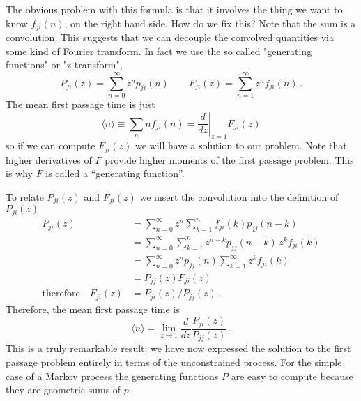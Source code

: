 \documentclass{article}
\begin{document}
The obvious problem with this formula is that it involves the thing we want to know $f_{ji}(n)$, on the right hand side.
How do we fix this? Note that the sum is a convolution.
This suggests that we can decouple the convolved quantities via some kind of Fourier transform.
In fact we use the so called "generating functions" or "z-transform",
\begin{equation}
P_{ji}(z)=\sum_{n=0}^{\infty}z^{n}p_{ji}(n)\qquad F_{ji}(z)=\sum_{n=1}^{\infty}z^{n}f_{ji}(n) \, .
\end{equation}
The mean first passage time is just
\begin{equation}
\langle n \rangle \equiv \sum_n n f_{ji}(n) = \left. \frac{d}{dz}\right|_{z=1}F_{ji}(z)
\end{equation}
so if we can compute $F_{ji}(z)$ we will have a solution to our problem.
Note that higher derivatives of $F$ provide higher moments of the first passage problem.
This is why $F$ is called a ``generating function''.

To relate $P_{ji}(z)$ and $F_{ji}(z)$ we insert the convolution into the definition of $P_{ji}(z)$
\begin{align*}
P_{ji}(z)
& = \sum_{n=0}^{\infty}z^{n}\sum_{k=1}^{n}f_{ji}(k)p_{jj}(n-k)\\
& = \sum_{n=0}^{\infty}\sum_{k=1}^{n}z^{n-k}p_{jj}(n-k)\, z^{k}f_{ji}(k)\\
& = \sum_{n=0}^{\infty}z^{n}p_{jj}(n)\sum_{k=1}^{\infty}z^{k}f_{ji}(k)\\
& = P_{jj}(z)F_{ji}(z)\\
\textrm{therefore}\quad F_{ji}(z) & = P_{ji}(z)/P_{jj}(z) \, .
\end{align*}
Therefore, the mean first passage time is
\begin{equation}
\langle n \rangle = \lim_{z \rightarrow 1} \frac{d}{dz} \frac{P_{ji}(z)}{P_{jj}(z)} \, .
\end{equation}
This is a truly remarkable result: we have now expressed the solution to the first passage problem entirely in terms of the unconstrained process.
For the simple case of a Markov process the generating functions $P$ are easy to compute because they are geometric sums of $p$.
\end{document}
